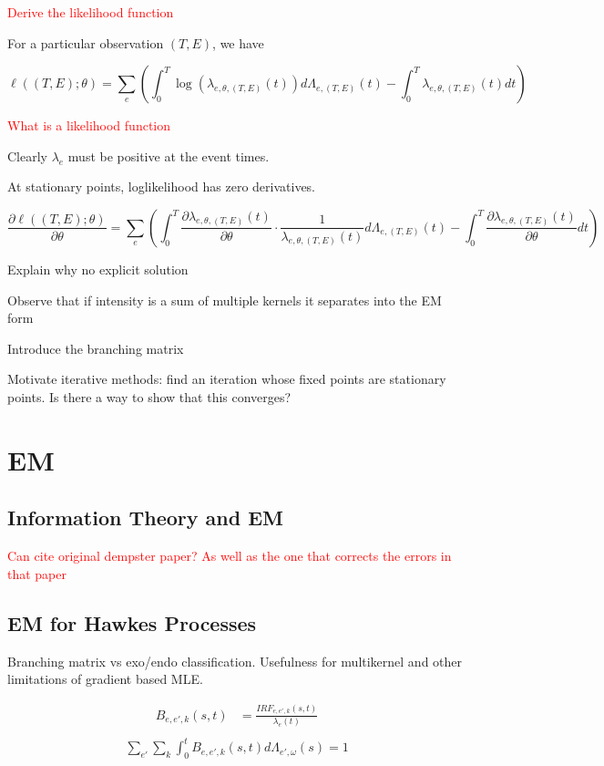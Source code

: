 \documentclass[honours,12pt]{unswthesis}
\numberwithin{equation}{section}
\begin{document}
\textcolor{red}{Derive the likelihood function}

For a particular observation $(T,E)$, we have

$$\ell((T,E);\theta) = \sum_e \left(\int_0^T \log(\lambda_{e,\theta,(T,E)}(t))d\Lambda_{e,(T,E)}(t)-\int_0^T \lambda_{e,\theta,(T,E)}(t)dt\right)$$

\textcolor{red}{What is a likelihood function}


Clearly $\lambda_e$ must be positive at the event times.

At stationary points, loglikelihood has zero derivatives.

$$\frac{\partial \ell((T,E);\theta)}{\partial \theta} = \sum_{e}\left(\int_0^T \frac{\partial \lambda_{e,\theta,(T,E)}(t)}{\partial \theta}\cdot\frac{1}{\lambda_{e,\theta,(T,E)}(t)}d\Lambda_{e,(T,E)}(t) - \int_0^T \frac{\partial\lambda_{e,\theta,(T,E)}(t)}{\partial \theta}dt\right)$$

Explain why no explicit solution

Observe that if intensity is a sum of multiple kernels it separates into the EM form

Introduce the branching matrix

Motivate iterative methods: find an iteration whose fixed points are stationary points. Is there a way to show that this converges?

\section{EM}

\subsection{Information Theory and EM}
\textcolor{red}{Can cite original dempster paper? As well as the one that corrects the errors in that paper}

\subsection{EM for Hawkes Processes}
Branching matrix vs exo/endo classification. Usefulness for multikernel and other limitations of gradient based MLE.

\begin{align*}
	B_{e,e',k}(s,t)
	&= \frac{IRF_{e,e',k}(s,t)}{\lambda_{e}(t)} \\
\end{align*}
\begin{align*}
	\sum_{e'} \sum_{k} \int_0^t B_{e,e',k}(s,t)d\Lambda_{e',\omega}(s) = 1
\end{align*}
\end{document}
